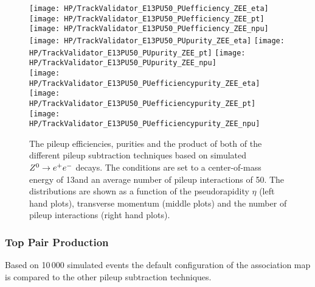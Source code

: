 \begin{figure}[!h]
  \centering
  \texttt{[image: HP/TrackValidator\_E13PU50\_PUefficiency\_ZEE\_eta]}
  \texttt{[image: HP/TrackValidator\_E13PU50\_PUefficiency\_ZEE\_pt]}
  \texttt{[image: HP/TrackValidator\_E13PU50\_PUefficiency\_ZEE\_npu]}
   \\
  \texttt{[image: HP/TrackValidator\_E13PU50\_PUpurity\_ZEE\_eta]}
  \texttt{[image: HP/TrackValidator\_E13PU50\_PUpurity\_ZEE\_pt]}
  \texttt{[image: HP/TrackValidator\_E13PU50\_PUpurity\_ZEE\_npu]}
   \\
  \texttt{[image: HP/TrackValidator\_E13PU50\_PUefficiencypurity\_ZEE\_eta]}
  \texttt{[image: HP/TrackValidator\_E13PU50\_PUefficiencypurity\_ZEE\_pt]}
  \texttt{[image: HP/TrackValidator\_E13PU50\_PUefficiencypurity\_ZEE\_npu]}
  \caption[Pileup efficiencies, purities and their product of the different pileup subtraction techniques based $\Zz\rightarrow\EE$ decays with 13\TeV and $\left<PU\right>=50$]{The pileup efficiencies, purities and the product of both of the different pileup subtraction techniques based on simulated$\Zz\rightarrow\EE$ decays. The conditions are set to a center-of-mass energy of 13\TeV and an average number of pileup interactions of 50. The distributions are shown as a function of the pseudorapidity $\eta$ (left hand plots), transverse momentum (middle plots) and the number of pileup interactions (right hand plots).}
\end{figure}
\clearpage

\subsubsection{Top Pair Production}

Based on 10\,000 simulated \ttbar events the default configuration of the association map is compared to the other pileup subtraction techniques.

